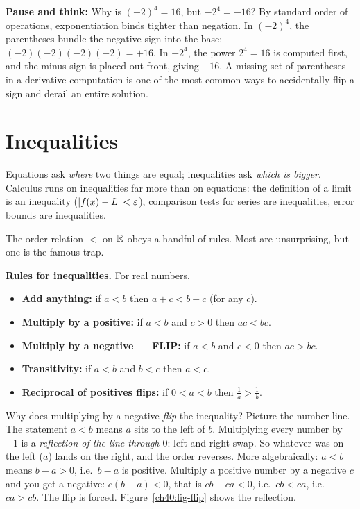 \begin{recoverybox}
\textbf{Pause and think:} Why is $(-2)^4 = 16$, but $-2^4 = -16$?
By standard order of operations, exponentiation binds tighter than negation. In
$(-2)^4$, the parentheses bundle the negative sign into the base:
$(-2)(-2)(-2)(-2) = +16$. In $-2^4$, the power $2^4 = 16$ is computed first, and
the minus sign is placed out front, giving $-16$. A missing set of parentheses
in a derivative computation is one of the most common ways to accidentally flip
a sign and derail an entire solution.
\end{recoverybox}

\section{Inequalities}
\label{ch40:inequalities}

Equations ask \emph{where} two things are equal; inequalities ask \emph{which is
bigger}. Calculus runs on inequalities far more than on equations: the definition
of a limit is an inequality ($\lvert f(x)-L\rvert<\varepsilon$), comparison tests for series are
inequalities, error bounds are inequalities.

The order relation $<$ on $\mathbb{R}$ obeys a handful of rules. Most are unsurprising, but
one is the famous trap.

\begin{focusbox}
\textbf{Rules for inequalities.} For real numbers,
\begin{itemize}
  \item \textbf{Add anything:} if $a < b$ then $a + c < b + c$ (for any $c$).
  \item \textbf{Multiply by a positive:} if $a<b$ and $c>0$ then $ac < bc$.
  \item \textbf{Multiply by a negative --- FLIP:} if $a<b$ and $c<0$ then
        $ac > bc$.
  \item \textbf{Transitivity:} if $a<b$ and $b<c$ then $a<c$.
  \item \textbf{Reciprocal of positives flips:} if $0<a<b$ then
        $\tfrac1a > \tfrac1b$.
\end{itemize}
\end{focusbox}

\begin{whybox}
Why does multiplying by a negative \emph{flip} the inequality? Picture the number
line. The statement $a<b$ means $a$ sits to the left of $b$. Multiplying every
number by $-1$ is a \emph{reflection of the line through $0$}: left and right swap.
So whatever was on the left ($a$) lands on the right, and the order reverses. More
algebraically: $a<b$ means $b-a>0$, i.e.\ $b-a$ is positive. Multiply a positive
number by a negative $c$ and you get a negative: $c(b-a)<0$, that is $cb-ca<0$,
i.e.\ $cb<ca$, i.e.\ $ca>cb$. The flip is forced.
Figure~\ref{ch40:fig-flip} shows the reflection.
\end{whybox}

